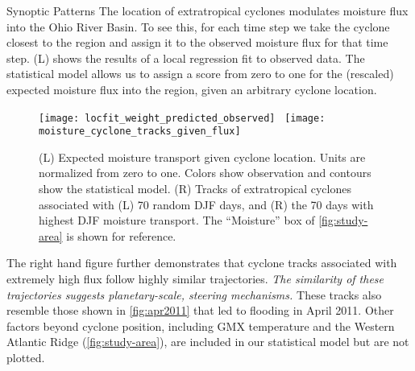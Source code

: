 \begin{block}{Synoptic Patterns}
    The location of extratropical cyclones modulates moisture flux into the Ohio River Basin.
    To see this, for each time step we take the cyclone closest to the region and assign it to the observed moisture flux for that time step.
     (L) shows the results of a local regression \cite{Loader1999} fit to observed data.
    The statistical model allows us to assign a score from zero to one for the (rescaled) expected moisture flux into the region, given an arbitrary cyclone location.
    \begin{figure}
        \texttt{[image: locfit\_weight\_predicted\_observed]}~
        \texttt{[image: moisture\_cyclone\_tracks\_given\_flux]}
        \caption{(L) Expected moisture transport given cyclone location. Units are normalized from zero to one. Colors show observation and contours show the statistical model.
                (R) Tracks of extratropical cyclones associated with (L) 70 random DJF days, and (R) the 70 days with highest DJF moisture transport. The ``Moisture'' box of \cref{fig:study-area} is shown for reference.}
        \label{fig:track-given-flux}
    \end{figure}
    The right hand figure further demonstrates that cyclone tracks associated with extremely high flux follow highly similar trajectories.
    \emph{The similarity of these trajectories suggests planetary-scale, steering mechanisms.}
    These tracks also resemble those shown in \cref{fig:apr2011} that led to flooding in April 2011.
    Other factors beyond cyclone position, including GMX temperature and the Western Atlantic Ridge (\cref{fig:study-area}), are included in our statistical model but are not plotted.

\end{block}
